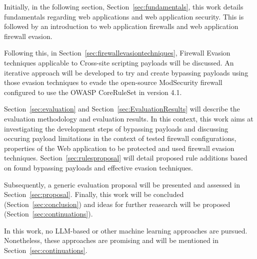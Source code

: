 Initially, in the following section, Section~\ref{sec:fundamentals}, this work details fundamentals regarding web applications and web application security. This is followed by an introduction to web application firewalls and web application firewall evasion.


Following this, in Section~\ref{sec:firewallevasiontechniques}, Firewall Evasion techniques applicable to Cross-site scripting payloads will be discussed.
An iterative approach will be developed to try and create bypassing payloads using those evasion techniques to evade the open-source ModSecurity firewall configured to use the OWASP CoreRuleSet in version 4.1.

Section~\ref{sec:evaluation} and Section~\ref{sec:EvaluationResults} will describe the evaluation methodology and evaluation results. In this context, this work aims at investigating the development steps of bypassing payloads and discussing occuring payload limitations in the context of tested firewall configurations, properties of the Web application to be protected and used firewall evasion techniques. Section~\ref{sec:rulesproposal} will detail proposed rule additions based on found bypassing payloads and effective evasion techniques.

Subsequently, a generic evaluation proposal will be presented and assessed in Section~\ref{sec:proposal}. Finally, this work will be concluded (Section~\ref{sec:conclusion}) and ideas for further reasearch will be proposed (Section~\ref{sec:continuations}).

In this work, no LLM-based or other machine learning approaches are pursued. Nonetheless, these approaches are promising and will be mentioned in Section~\ref{sec:continuations}.

